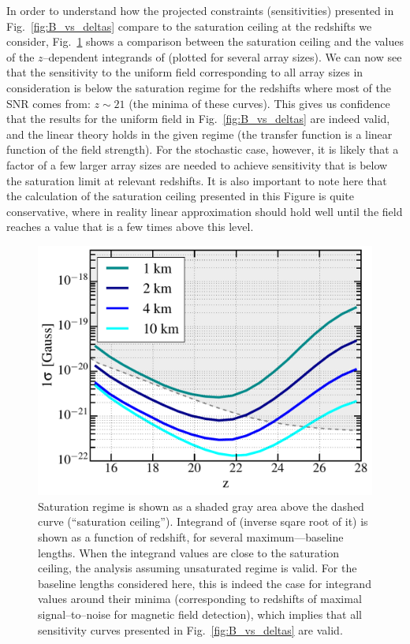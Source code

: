 In order to understand how the projected constraints (sensitivities) presented in Fig.~\ref{fig:B_vs_deltas} compare to the saturation ceiling at the redshifts we consider, Fig.~\ref{fig:Bsat} shows a comparison between the saturation ceiling and the values of the $z$--dependent integrands of \eq{\ref{eq:fisher_patch}} (plotted for several array sizes). We can now see that the sensitivity to the uniform field corresponding to all array sizes in consideration is below the saturation regime for the redshifts where most of the SNR comes from: $z\sim21$ (the minima of these curves). This gives us confidence that the results for the uniform field in Fig.~\ref{fig:B_vs_deltas} are indeed valid, and the linear theory holds in the given regime (the transfer function is a linear function of the field strength). For the stochastic case, however, it is likely that a factor of a few larger array sizes are needed to achieve sensitivity that is below the saturation limit at relevant redshifts. It is also important to note here that the calculation of the saturation ceiling presented in this Figure is quite conservative, where in reality linear approximation should hold well until the field reaches a value that is a few times above this level.
\begin{figure}
\centering
\includegraphics[width=.35\textwidth,keepaspectratio=true]{sigmaB0_vs_z.pdf}
\caption{Saturation regime is shown as a shaded gray area above the dashed curve (``saturation ceiling''). Integrand of \eq{\ref{eq:fisher_patch}} (inverse sqare root of it) is shown as a function of redshift, for several maximum---baseline lengths.  When the integrand values are close to the saturation ceiling, the analysis assuming unsaturated regime is valid. For the baseline lengths considered here, this is indeed the case for integrand values around their minima (corresponding to redshifts of maximal signal--to--noise for magnetic field detection), which implies that all sensitivity curves presented in Fig.~\ref{fig:B_vs_deltas} are valid. \label{fig:Bsat}}
\end{figure}
